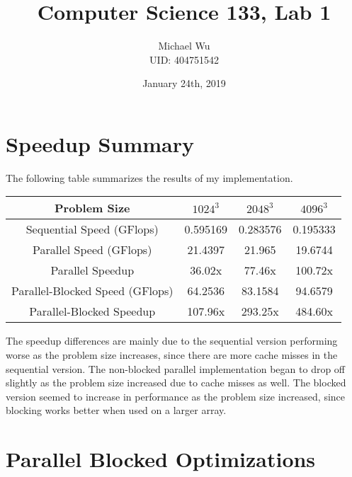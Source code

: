 \documentclass[12pt]{article}
\begin{document}
\title{Computer Science 133, Lab 1}
\date{January 24th, 2019}
\author{Michael Wu\\UID: 404751542}
\maketitle

\section{Speedup Summary}

The following table summarizes the results of my implementation.
\begin{center}
    \begin{tabular}{c|c|c|c}
        Problem Size & \(1024^3\) & \(2048^3\) & \(4096^3\)\\
        \hline
        Sequential Speed (GFlops) & 0.595169 & 0.283576 & 0.195333\\
        Parallel Speed (GFlops) & 21.4397 & 21.965 & 19.6744\\
        Parallel Speedup & 36.02x & 77.46x & 100.72x\\
        Parallel-Blocked Speed (GFlops)& 64.2536 & 83.1584 & 94.6579\\
        Parallel-Blocked Speedup & 107.96x & 293.25x & 484.60x
    \end{tabular}
\end{center}
The speedup differences are mainly due to the sequential version performing
worse as the problem size increases, since there are more cache misses in the
sequential version. The non-blocked parallel implementation began to drop
off slightly as the problem size increased due to cache misses as well. The
blocked version seemed to increase in performance as the problem size increased,
since blocking works better when used on a larger array.

\section{Parallel Blocked Optimizations}
\end{document}

